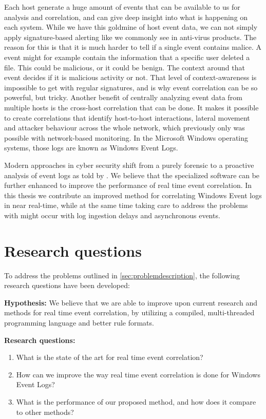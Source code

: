 Each host generate a huge amount of events that can be available to us for analysis and correlation, and can give deep insight into what is happening on each system. While we have this goldmine of host event data, we can not simply apply signature-based alerting like we commonly see in anti-virus products. The reason for this is that it is much harder to tell if a single event contains malice. A event might for example contain the information that a specific user deleted a file. This could be malicious, or it could be benign. The context around that event decides if it is malicious activity or not. That level of context-awareness is impossible to get with regular signatures, and is why event correlation can be so powerful, but tricky.
Another benefit of centrally analyzing event data from multiple hosts is the cross-host correlation that can be done. It makes it possible to create correlations that identify host-to-host interactions, lateral movement and attacker behaviour across the whole network, which previously only was possible with network-based monitoring. In the Microsoft Windows operating systems, those logs are known as Windows Event Logs.

Modern approaches in cyber security shift from a purely forensic to a proactive analysis of event logs as told by \textcite{He_2017}. We believe that the specialized software can be further enhanced to improve the performance of real time event correlation. In this thesis we contribute an improved method for correlating Windows Event logs in near real-time, while at the same time taking care to address the problems with might occur with log ingestion delays and asynchronous events.

\section{Research questions}
\label{sec:researchquestions}
To address the problems outlined in \ref{sec:problemdescription}, the following research questions have been developed:

\medskip

\textbf{Hypothesis:} We believe that we are able to improve upon current research and methods for real time event correlation, by utilizing a compiled, multi-threaded programming language and better rule formats.

\medskip

\textbf{Research questions:}
\begin{enumerate}
    \item What is the state of the art for real time event correlation?
    \item How can we improve the way real time event correlation is done for Windows Event Logs? %
    \item What is the performance of our proposed method, and how does it compare to other methods?
\end{enumerate}

